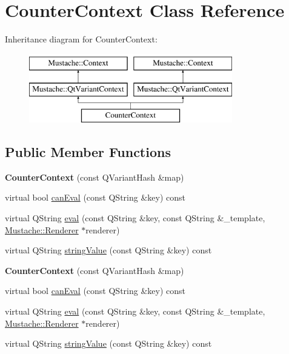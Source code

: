 \hypertarget{classCounterContext}{}\section{Counter\+Context Class Reference}
\label{classCounterContext}
Inheritance diagram for Counter\+Context\+:\begin{figure}[H]
\begin{center}
\leavevmode
\includegraphics[height=3.000000cm]{db/da6/classCounterContext}
\end{center}
\end{figure}
\subsection*{Public Member Functions}
\begin{DoxyCompactItemize}
\item 
\hypertarget{classCounterContext_a05c70666c806b2cd888c24f5edae8d87}{}{\bfseries Counter\+Context} (const Q\+Variant\+Hash \&map)\label{classCounterContext_a05c70666c806b2cd888c24f5edae8d87}

\item 
virtual bool \hyperlink{classCounterContext_a2b2c8d5bbd329e20ce6e16be72676291}{can\+Eval} (const Q\+String \&key) const 
\item 
virtual Q\+String \hyperlink{classCounterContext_a01764884d5bdbe014b8e569c10c82e99}{eval} (const Q\+String \&key, const Q\+String \&\+\_\+template, \hyperlink{classMustache_1_1Renderer}{Mustache\+::\+Renderer} $\ast$renderer)
\item 
virtual Q\+String \hyperlink{classCounterContext_adb984d696efcc32abaaf0aaeade4f8b8}{string\+Value} (const Q\+String \&key) const 
\item 
\hypertarget{classCounterContext_a05c70666c806b2cd888c24f5edae8d87}{}{\bfseries Counter\+Context} (const Q\+Variant\+Hash \&map)\label{classCounterContext_a05c70666c806b2cd888c24f5edae8d87}

\item 
virtual bool \hyperlink{classCounterContext_a2b2c8d5bbd329e20ce6e16be72676291}{can\+Eval} (const Q\+String \&key) const 
\item 
virtual Q\+String \hyperlink{classCounterContext_a01764884d5bdbe014b8e569c10c82e99}{eval} (const Q\+String \&key, const Q\+String \&\+\_\+template, \hyperlink{classMustache_1_1Renderer}{Mustache\+::\+Renderer} $\ast$renderer)
\item 
virtual Q\+String \hyperlink{classCounterContext_adb984d696efcc32abaaf0aaeade4f8b8}{string\+Value} (const Q\+String \&key) const 
\end{DoxyCompactItemize}
